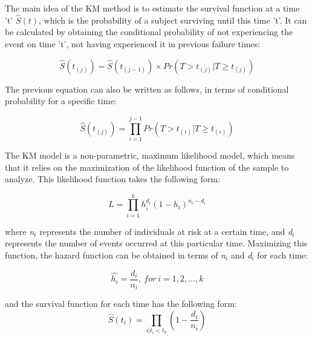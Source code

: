 \documentclass[11pt]{book} %
\begin{document}
    The main idea of the KM method is to estimate the survival function at a time 't' $\widehat{S}(t)$, which is the probability of a subject surviving until this time 't'. It can be calculated by obtaining the conditional probability of not experiencing the event on time 't', not having experienced it in previous failure times:

    \begin{equation}
      \widehat{S}(t_{(j)}) = \widehat{S}(t_{(j-1)}) \times Pr(T>t_{(j)}|T \geq t_{(j)})
      \label{eq:KM-eq-surv}
    \end{equation}

    The previous equation can also be written as follows, in terms of conditional probability for a specific time:

    \begin{equation}
      \widehat{S}(t_{(j)}) = \prod_{i=1}^{j-1} Pr(T>t_{(i)}|T\geq t_{(i)})
      \label{eq:KM-eq-probab}
    \end{equation}

    The KM model is a non-parametric, maximum likelihood model, which means that it relies on the maximization of the likelihood function of the sample to analyze. This likelihood function takes the following form:

    \begin{equation}
      L = \prod_{i=1}^k h_i^{d_i}(1-h_i)^{n_i-d_i}
      \label{eq:km-likelihood-function}
    \end{equation}

    where \emph{n$_i$} represents the number of individuals at risk at a certain time, and \emph{d$_i$} represents the number of events occurred at this particular time. Maximizing this function, the hazard function can be obtained in terms of \emph{n$_i$} and \emph{d$_i$} for each time:

    \begin{equation}
      \widehat{h_i}=\frac{d_i}{n_i}, \ for \ i = 1,2,...,k
      \label{eq:km-hazard-function}
    \end{equation}

    and the survival function for each time has the following form:
    \begin{equation}
      \widehat{S}(t_i) = \prod_{i | t_i < t_k}(1 - \frac{d_i}{n_i})
      \label{eq:km-survival-function}
    \end{equation}
\end{document}
